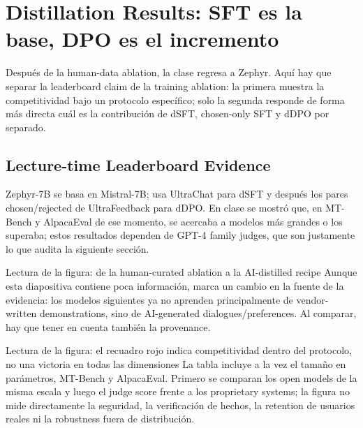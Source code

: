 \section{Distillation Results: SFT es la base, DPO es el incremento}

Después de la human-data ablation, la clase regresa a Zephyr. Aquí hay que separar la leaderboard claim de la training ablation: la primera muestra la competitividad bajo un protocolo específico; solo la segunda responde de forma más directa cuál es la contribución de dSFT, chosen-only SFT y dDPO por separado.

\subsection{Lecture-time Leaderboard Evidence}

Zephyr-7B se basa en Mistral-7B; usa UltraChat para dSFT y después los pares chosen/rejected de UltraFeedback para dDPO. En clase se mostró que, en MT-Bench y AlpacaEval de ese momento, se acercaba a modelos más grandes o los superaba; estos resultados dependen de GPT-4 family judges, que son justamente lo que audita la siguiente sección.


\begin{knowledgebox}{Lectura de la figura: de la human-curated ablation a la AI-distilled recipe}
Aunque esta diapositiva contiene poca información, marca un cambio en la fuente de la evidencia: los modelos siguientes ya no aprenden principalmente de vendor-written demonstrations, sino de AI-generated dialogues/preferences. Al comparar, hay que tener en cuenta también la provenance.
\end{knowledgebox}


\begin{knowledgebox}{Lectura de la figura: el recuadro rojo indica competitividad dentro del protocolo, no una victoria en todas las dimensiones}
La tabla incluye a la vez el tamaño en parámetros, MT-Bench y AlpacaEval. Primero se comparan los open models de la misma escala y luego el judge score frente a los proprietary systems; la figura no mide directamente la seguridad, la verificación de hechos, la retention de usuarios reales ni la robustness fuera de distribución.
\end{knowledgebox}


